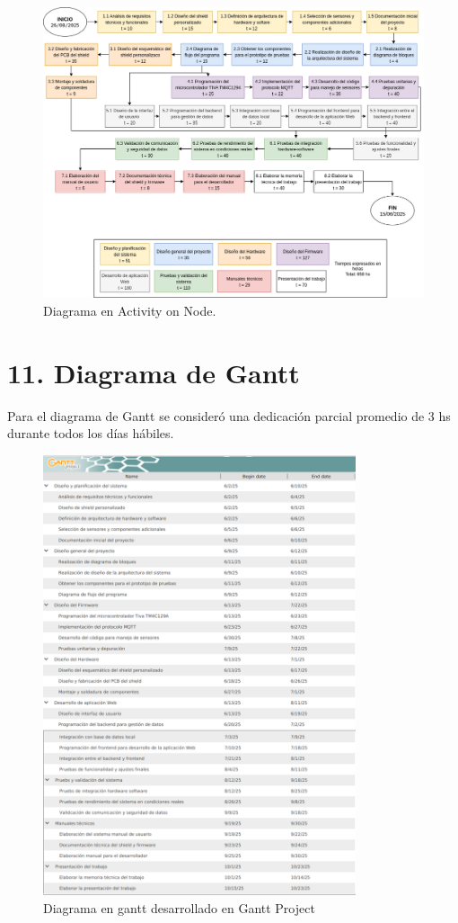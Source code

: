 \documentclass[
11pt, %
]{charter}
\begin{document}
\begin{figure}[htpb]
	\centering 
	\includegraphics[width=1.0\textwidth]{./Figuras/AoN.png}
	\caption{Diagrama en Activity on Node.}
	\label{fig:AoN}
\end{figure}
\newpage
\section{11. Diagrama de Gantt}
\label{sec:gantt}

Para el diagrama de Gantt se consideró una dedicación parcial promedio de 3 hs durante todos los días hábiles.

\begin{figure}[htpb]
	\centering 
	\includegraphics[width=0.82\textwidth]{./Figuras/gantt_1.png}
	\caption{Diagrama en gantt desarrollado en Gantt Project}
	\label{fig:Gannt1}
\end{figure}
\end{document}
